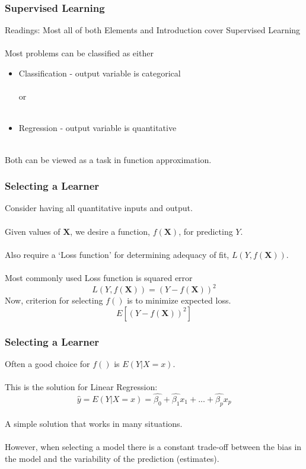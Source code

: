 \documentclass[hide notes,red,handout]{beamer}
\begin{document}
\begin{frame}[t]
\frametitle{Supervised Learning}
Readings: Most all of both Elements and Introduction cover Supervised Learning\\~\\\pause
Most problems can be classified as either
\begin{itemize}
\item Classification - output variable is categorical\\~\\
or \\~\\
\item Regression - output variable is quantitative\\~\\
\end{itemize}
Both can be viewed as a task in function approximation.
\end{frame}


\begin{frame}[t]
\frametitle{Selecting a Learner}
Consider having all quantitative inputs and output.\\~\\
Given values of $\textbf{X}$, we desire a function, $f(\textbf{X})$, for predicting $Y$.\\~\\\pause
Also require a `Loss function' for determining adequacy of fit, $L(Y,f(\textbf{X}))$.\\~\\
Most commonly used Loss function is squared error
$$L(Y,f(\textbf{X}))=(Y-f(\textbf{X}))^2$$\pause
Now, criterion for selecting $f()$ is to minimize expected loss.
$$E\left[(Y-f(\textbf{X}))^2\right]$$
\end{frame}

\begin{frame}[t]
\frametitle{Selecting a Learner}
Often a good choice for $f()$ is $E(Y|X=x)$. \\~\\
This is the solution for Linear Regression:
$$\hat{y}=E(Y|X=x)=\hat{\beta_0}+\hat{\beta_1}x_1+...+\hat{\beta_p}x_p$$~\\
A simple solution that works in many situations.\\~\\\pause
However, when selecting a model there is a constant trade-off between the bias in the model and the variability of the prediction (estimates).
\end{frame}
\end{document}

